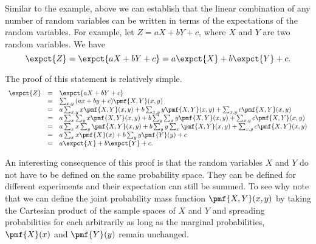 \begin{gram}
Similar to the example, above we can establish that the linear
combination of any number of random variables can be written in terms
of the expectations of the random variables.  For example, let $Z = aX
+ bY + c$, where $X$ and $Y$ are two random variables. We have
\[
\expct{Z} = \expct{aX + bY + c} = a\expct{X} + b \expct{Y} + c.
\]

The proof of this statement is relatively simple.
\[
\begin{array}{lll}
\expct{Z} & = & \expct{aX + bY + c} 
\\
& = & \sum_{x,y}{(ax + by + c) \pmf{X,Y}(x,y)}
\\
& = & a\sum_{x,y}{x \pmf{X,Y}(x,y)} + b\sum_{x,y}{y \pmf{X,Y}(x,y)} + \sum_{x,y}{c \pmf{X,Y}(x,y)}
\\
& = & a\sum_{x}\sum_{y}{x \pmf{X,Y}(x,y)} + b\sum_{y}\sum_x{y  \pmf{X,Y}(x,y)} + \sum_{x,y}{c \pmf{X,Y}(x,y)}
\\
& = & a\sum_{x}x\sum_{y}{\pmf{X,Y}(x,y)} + b\sum_{y} y \sum_x{\pmf{X,Y}(x,y)} + \sum_{x,y}{c \pmf{X,Y}(x,y)}
\\
& = & a\sum_{x}x{\pmf{X}(x) + b\sum_{y} y \pmf{Y}(y)} + c
\\
& = & a \expct{X} + b \expct{Y} + c.
\end{array}
\]

An interesting consequence of this proof is that the random variables
$X$ and $Y$ do not have to be defined on the same probability space.
They can be defined for different experiments and their expectation
can still be summed.
%
To see why note that we can define the joint probability mass function
$\pmf{X,Y}(x,y)$ by taking the Cartesian product of the sample spaces
of $X$ and $Y$ and spreading probabilities for each arbitrarily as
long as the marginal probabilities, $\pmf{X}(x)$ and $\pmf{Y}(y)$
remain unchanged.
%

\end{gram}

